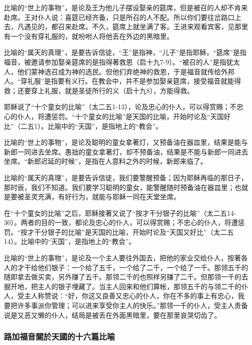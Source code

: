 比喻的“世上的事物”，是论及王为他儿子摆设娶亲的筵席，但是被召的人却不肯来赴席。王对仆人说：喜筵已经齐备，只是所召的人不配。所以你们要往岔路口上去，凡遇见的，都召来赴席。不久，筵席上就坐满了客。王进来观看宾客，见那里有一个没有穿礼服的，就吩咐人将他丢在外边的黑暗里。

比喻的“属天的真理”，是要告诉信徒，“王”是指神，“儿子”是指耶稣，“筵席”是指福音，被邀请参加娶亲筵席的是指得著救恩（启十九7-9）。“被召的人”是指犹太人，他们蒙神选召成为神的选民。但他们弃绝神的救恩，于是福音就传给外邦人。“穿礼服”是指要有义行。在教会中，并不是参加娶亲筵席，接受福音就能得救；还要穿上礼服，就是圣徒所行的义（启十九8），方能得救。


耶稣说了“十个童女的比喻”（太二五1-13），论及忠心的仆人，可以得赏赐；不忠心的仆人，将遭惩罚。“十个童女的比喻”是天国的比喻，开始时论及“天国好比”（二五1）。比喻中的“天国”，是指地上的“教会”。

比喻的“世上的事物”，是论及聪明的童女拿著灯，又预备油在器皿里，结果是能与新郎一同进去坐席。愚拙的童女拿著灯，却不预备油，结果是不能与新郎一同进去坐席。“新郎迟延的时候”，是指在人意料之外的时候，新郎来临了。

比喻的“属天的真理”，是要告诉信徒，我们要警醒预备；因为耶稣再临的那日子，那时辰，我们不知道。我们要学习聪明的童女，能警醒随时预备油在器皿里；也就是要被圣灵充满，有好行为，就能与耶稣一同在天堂坐席。


在“十个童女的比喻”之后，耶稣接著又说了“按才干分银子的比喻”（太二五14-30）。两者的目的一致，都论及忠心的仆人，可以得赏赐；不忠心的仆人，将遭惩罚。“按才干分银子的比喻”是天国的比喻，开始时论及“天国又好比”（太二五14）。比喻中的“天国”，是指地上的“教会”。

比喻的“世上的事物”，是论及一个主人要往外国去，把他的家业交给仆人，按著各人的才干给他们银子：一个给了五千，一个给了二千，一个给了一千。那领五千的随即拿去做买卖，另外赚了五千。那领二千的也照样另赚了二千。但那领一千的去掘开地，把主人的银子埋藏了。当主人回来和他们算帐，那领五千的与领二千的仆人，受主人称赞说：“好，你这又良善又忠心的仆人，你在不多的事上有忠心，我要把许多事派你管理；可以进来享受你主人的快乐。”那领一千的仆人，受主人责备说是又恶又懒的仆人，结局是被丢在外面黑暗里，要在那里哀哭切齿了。


\subsubsection{路加福音關於天國的十六篇比喻}

